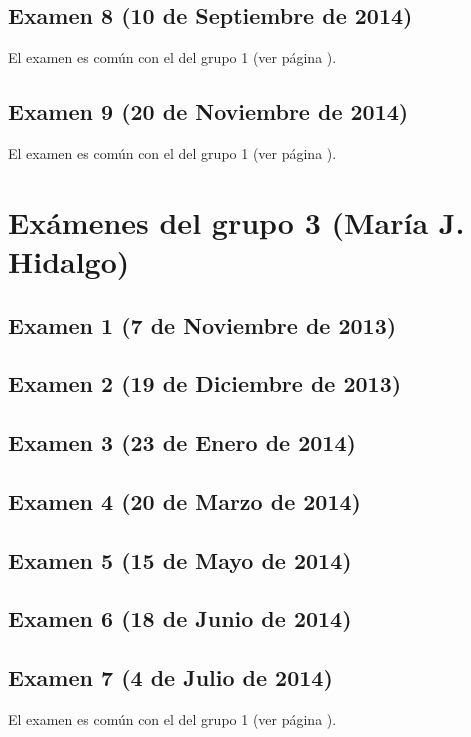 \documentclass[a4paper,12pt,twoside]{book}
\begin{document}
\subsection{Examen 8 (10 de Septiembre de 2014)}
El examen es común con el del grupo 1 (ver página \pageref{examen_13_14_3_8}).
\subsection{Examen 9 (20 de Noviembre de 2014)}
El examen es común con el del grupo 1 (ver página \pageref{examen_13_14_3_9}).

\section{Exámenes del grupo 3 (María J. Hidalgo)}
\subsection{Examen 1 (7 de Noviembre de 2013)}
\subsection{Examen 2 (19 de Diciembre de 2013)}
\subsection{Examen 3 (23 de Enero de 2014)}
 \label{examen_13_14_1_3}
\subsection{Examen 4 (20 de Marzo de 2014)}
\subsection{Examen 5 (15 de Mayo de 2014)}
\subsection{Examen 6 (18 de Junio de 2014)}
 \label{examen_13_14_1_6}
\subsection{Examen 7 (4 de Julio de 2014)}
El examen es común con el del grupo 1 (ver página \pageref{examen_13_14_3_7}).
\end{document}
